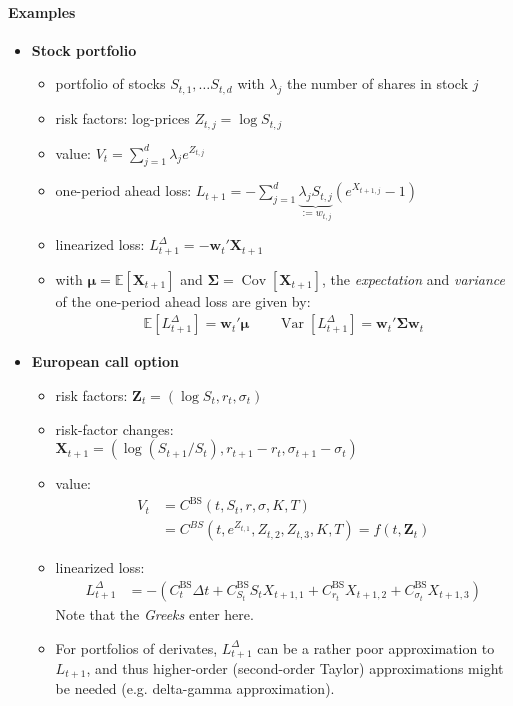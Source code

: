 \documentclass[a4paper,landscape,8pt,fleqn]{scrartcl}
\renewcommand{\emph}[1]{\textbf{#1}}
\DeclareMathOperator{\Var}{Var}				%
\DeclareMathOperator{\Cov}{Cov}				%
\begin{document}
\begin{multicols*}{3}
\paragraph{Examples}
\begin{itemize}
\item \emph{Stock portfolio}
\begin{itemize}
\item portfolio of stocks $S_{t,1}, \ldots S_{t,d}$ with $\lambda_j$ the number of shares in stock $j$
\item risk factors: log-prices $Z_{t,j} = \log S_{t,j}$
\item value: $V_t = \sum_{j=1}^d \lambda_j e^{Z_{t,j}}$
\item one-period ahead loss: $L_{t+1} = -\sum_{j=1}^d \underbrace{\lambda_j S_{t,j}}_{:= w_{t,j}} (e^{X_{t+1,j}}-1)$
\item linearized loss: $L_{t+1}^\Delta = - \bm w_t' \bm X_{t+1}$
\item with $\bm \mu = \mathbb{E}[\bm X_{t+1}]$ and $\bm \Sigma = \Cov[\bm X_{t+1}]$, the \textit{expectation} and \textit{variance} of the one-period ahead loss are given by:
\begin{align*}
\mathbb{E}[L_{t+1}^\Delta] = \bm w_t' \bm \mu \qquad \Var[L_{t+1}^\Delta] = \bm w_t' \bm \Sigma \bm w_t
\end{align*}
\end{itemize}
\item \emph{European call option}
\begin{itemize}
\item risk factors: $\bm Z_t = (\log S_t, r_t, \sigma_t)$
\item risk-factor changes: \\
$\bm X_{t+1} = (\log(S_{t+1}/S_t), r_{t+1}-r_t, \sigma_{t+1}-\sigma_t)$
\item value:
\begin{align*}
V_t &= C^\text{BS}(t, S_t, r, \sigma, K, T) \\
&= C^{BS}(t,e^{Z_{t,1}}, Z_{t,2}, Z_{t,3}, K, T) = f(t, \bm Z_t)
\end{align*}
\item linearized loss:
\begin{align*}
L_{t+1}^\Delta &= -(C_t^\text{BS} \Delta t + C_{S_t}^\text{BS} S_t X_{t+1,1} + C_{r_t}^\text{BS} X_{t+1,2} + C_{\sigma_t}^\text{BS} X_{t+1,3})
\end{align*}
Note that the \textit{Greeks} enter here.
\item For portfolios of derivates, $L_{t+1}^\Delta$ can be a rather poor approximation to $L_{t+1}$, and thus higher-order (second-order Taylor) approximations might be needed (e.g. delta-gamma approximation).
\end{itemize}
\end{itemize}


\end{multicols*}
\end{document}
